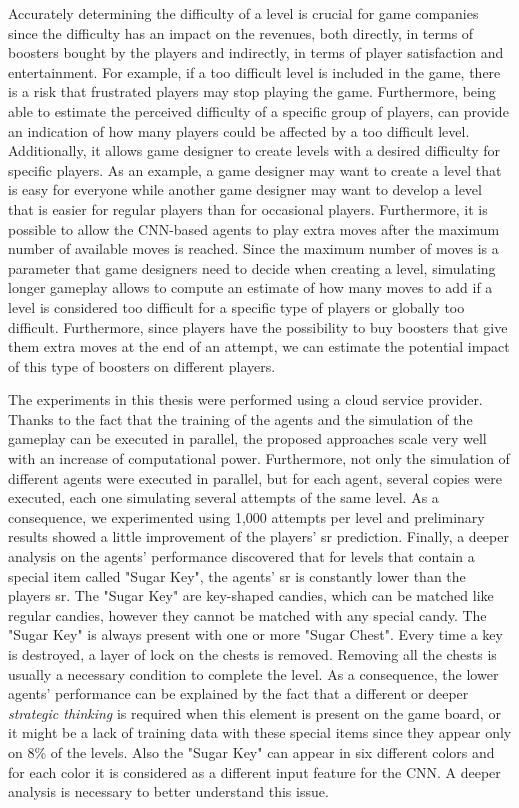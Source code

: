 Accurately determining the difficulty of a level is crucial for game companies since the difficulty has an impact on the revenues, both directly, in terms of boosters bought by the players and indirectly, in terms of player satisfaction and entertainment. For example, if a too difficult level is included in the game, there is a risk that frustrated players may stop playing the game. Furthermore, being able to estimate the perceived difficulty of a specific group of players, can provide an indication of how many players could be affected by a too difficult level. Additionally, it allows game designer to create levels with a desired difficulty for specific players. As an example, a game designer may want to create a level that is easy for everyone while another game designer may want to develop a level that is easier for regular players than for occasional players. 
Furthermore, it is possible to allow the \acs{CNN}-based agents to play extra moves after the maximum number of available moves is reached. Since the maximum number of moves is a parameter that game designers need to decide when creating a level, simulating longer gameplay allows to compute an estimate of how many moves to add if a level is considered too difficult for a specific type of players or globally too difficult. Furthermore, since players have the possibility to buy boosters that give them extra moves at the end of an attempt, we can estimate the potential impact of this type of boosters on different players.

The experiments in this thesis were performed using a cloud service provider. Thanks to the fact that the training of the agents and the simulation of the gameplay can be executed in parallel, the proposed approaches scale very well with an increase of computational power. Furthermore, not only the simulation of different agents were executed in parallel, but for each agent, several copies were executed, each one simulating several attempts of the same level. As a consequence, we experimented using 1,000 attempts per level and preliminary results showed a little improvement of the players' \acs{sr} prediction.
Finally, a deeper analysis on the agents' performance discovered that for levels that contain a special item called "Sugar Key", the agents' \acs{sr} is constantly lower than the players \acs{sr}. The "Sugar Key" are key-shaped candies, which can be matched like regular candies, however they cannot be matched with any special candy. The "Sugar Key" is always present with one or more "Sugar Chest". Every time a key is destroyed, a layer of lock on the chests is removed. Removing all the chests is usually a necessary condition to complete the level. As a consequence, the lower agents' performance can be explained by the fact that a different or deeper \textit{strategic thinking} is required when this element is present on the game board, or it might be a lack of training data with these special items since they appear only on 8\% of the levels. Also the "Sugar Key" can appear in six different colors and for each color it is considered as a different input feature for the \acs{CNN}. A deeper analysis is necessary to better understand this issue.


